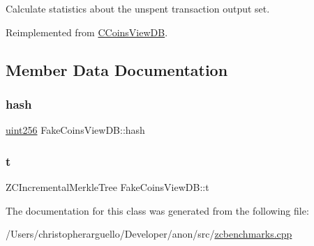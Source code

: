 Calculate statistics about the unspent transaction output set. 



Reimplemented from \mbox{\hyperlink{class_c_coins_view_d_b_a227bf56f8801921f12e56c6839104fce}{C\+Coins\+View\+DB}}.



\subsection{Member Data Documentation}
\mbox{\label{class_fake_coins_view_d_b_a982f684b55a8f103df3f43b7128f6938}} 
\subsubsection{\texorpdfstring{hash}{hash}}
{\footnotesize\ttfamily \mbox{\hyperlink{classuint256}{uint256}} Fake\+Coins\+View\+D\+B\+::hash\hspace{0.3cm}{\ttfamily [private]}}

\mbox{\label{class_fake_coins_view_d_b_a8478155455bb20042e4459c4179ae921}} 
\subsubsection{\texorpdfstring{t}{t}}
{\footnotesize\ttfamily Z\+C\+Incremental\+Merkle\+Tree Fake\+Coins\+View\+D\+B\+::t\hspace{0.3cm}{\ttfamily [private]}}



The documentation for this class was generated from the following file\+:\begin{DoxyCompactItemize}
\item 
/\+Users/christopherarguello/\+Developer/anon/src/\mbox{\hyperlink{zcbenchmarks_8cpp}{zcbenchmarks.\+cpp}}\end{DoxyCompactItemize}
